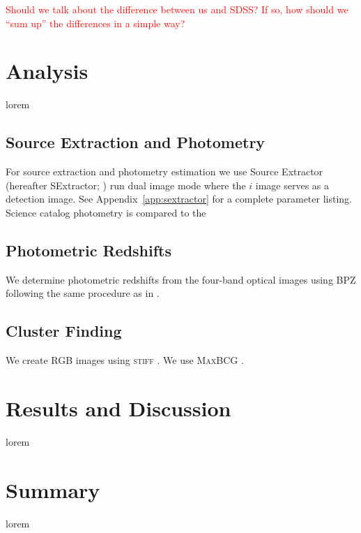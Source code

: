 \documentclass[apj, revtex4]{emulateapj}
\newcommand{\editorial}[1]{\textcolor{red}{#1}}
\begin{document}
\editorial{Should we talk about the difference between us and SDSS? If so, how should we ``sum up'' the differences in a simple way?} 

\section{Analysis}\label{sec:analysis}
lorem

\subsection{Source Extraction and Photometry}
For source extraction and photometry estimation we use Source Extractor (hereafter SExtractor; \citealt{Bertin1996}) run dual image mode where the $i$ image serves as a detection image. See Appendix~\ref{app:sextractor} for a complete parameter listing. Science catalog photometry is compared to the 



\subsection{Photometric Redshifts}
We determine photometric redshifts from the four-band optical images using BPZ \citep{Benitez2000} following the same procedure as in \cite{Menanteau2008a}.

\subsection{Cluster Finding}
We create RGB images using \textsc{stiff} \citep{Bertin2011}.
We use \textsc{MaxBCG} \citep{Koester2007b}.

\section{Results and Discussion}\label{sec:results}

lorem

\section{Summary}\label{sec:summary}

lorem
\end{document}
